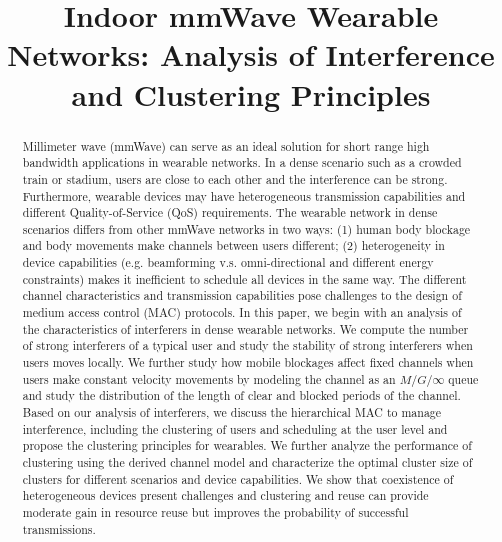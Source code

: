 \documentclass[10pt, conference, letterpaper]{IEEEtran}
\begin{document}
\title{Indoor mmWave Wearable Networks: Analysis of Interference and Clustering Principles}

\author{
}

\maketitle

\begin{abstract}
Millimeter wave (mmWave) can serve as an ideal solution for short range high bandwidth applications in wearable networks. In a dense scenario such as a crowded train or stadium, users are close to each other and the interference can be strong. Furthermore, wearable devices may have heterogeneous transmission capabilities and different Quality-of-Service (QoS) requirements. The wearable network in dense scenarios differs from other mmWave networks in two ways: (1) human body blockage and body movements make channels between users different; (2) heterogeneity in device capabilities (e.g. beamforming v.s. omni-directional and different energy constraints) makes it inefficient to schedule all devices in the same way. The different channel characteristics and transmission capabilities pose challenges to the design of medium access control (MAC) protocols. In this paper, we begin with an analysis of the characteristics of interferers in dense wearable networks. We compute the number of strong interferers of a typical user and study the stability of strong interferers when users moves locally. We further study how mobile blockages affect fixed channels when users make constant velocity movements by modeling the channel as an $M/G/\infty$ queue and study the distribution of the length of clear and blocked periods of the channel. Based on our analysis of interferers, we discuss the hierarchical MAC to manage interference, including the clustering of users and scheduling at the user level and propose the clustering principles for wearables. We further analyze the performance of clustering using the derived channel model and characterize the optimal cluster size of clusters for different scenarios and device capabilities. We show that coexistence of heterogeneous devices present challenges and clustering and reuse can provide moderate gain in resource reuse but improves the probability of successful transmissions. 


\end{abstract}
\IEEEpeerreviewmaketitle
\end{document}

